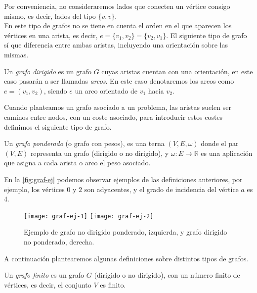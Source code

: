 Por conveniencia, no consideraremos lados que conecten un vértice consigo mismo, es decir, lados del tipo $\{v, v\}$. \\

En este tipo de grafos no se tiene en cuenta el orden en el que aparecen los vértices en una arista, es decir,  $e=\{v_1, v_2\}=\{v_2, v_1\}$. El siguiente tipo de grafo sí que diferencia entre ambas aristas, incluyendo una orientación sobre las mismas.

\begin{definicion}
	Un \textit{grafo dirigido} es un grafo $G$ cuyas aristas cuentan con una orientación, en este caso pasarán a ser llamadas \textit{arcos}. En este caso denotaremos los arcos como $e=(v_1,v_2)$, siendo $e$ un arco orientado de $v_1$ hacia $v_2$.
\end{definicion}

Cuando planteamos un grafo asociado a un problema, las aristas suelen ser caminos entre nodos, con un coste asociado, para introducir estos costes definimos el siguiente tipo de grafo.

\begin{definicion}
	Un \textit{grafo ponderado} (o grafo con pesos), es una terna $(V,E,\omega)$ donde el par $(V,E)$ representa un grafo (dirigido o no dirigido), y $\omega:E\rightarrow\mathbb{R}$ es una aplicación que asigna a cada arista o arco el peso asociado.
\end{definicion}

En la \autoref{fig:graf-ej} podemos observar ejemplos de las definiciones anteriores, por ejemplo, los vértices $0$ y $2$ son adyacentes, y el grado de incidencia del vértice $a$ es $4$. \\

\begin{figure}[htb]
	\centering
	\texttt{[image: graf-ej-1]}
	\texttt{[image: graf-ej-2]}
	\caption{Ejemplo de grafo no dirigido ponderado, izquierda, y grafo dirigido no ponderado, derecha.}
	\label{fig:graf-ej}
\end{figure}

A continuación plantearemos algunas definiciones sobre distintos tipos de grafos.

\begin{definicion}
	Un \textit{grafo finito} es un grafo $G$ (dirigido o no dirigido), con un número finito de vértices, es decir, el conjunto $V$ es finito.
\end{definicion}

